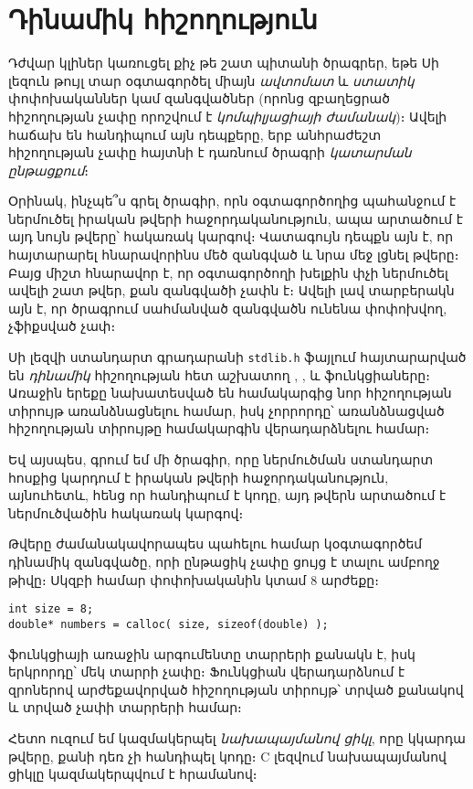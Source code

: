 \chapter{Դինամիկ հիշողություն}

Դժվար կլիներ կառուցել քիչ թե շատ պիտանի ծրագրեր, եթե Սի լեզուն թույլ տար
օգտագործել միայն \emph{ավտոմատ} և \emph{ստատիկ} փոփոխականներ կամ
զանգվածներ (որոնց զբաղեցրած հիշողության չափը որոշվում է
\emph{կոմպիլյացիայի ժամանակ})։ Ավելի հաճախ են հանդիպում այն դեպքերը, երբ
անհրաժեշտ հիշողության չափը հայտնի է դառնում ծրագրի \emph{կատարման
ընթացքում}։

Օրինակ, ինչպե՞ս գրել ծրագիր, որն օգտագործողից պահանջում է ներմուծել
իրական թվերի հաջորդականություն, ապա արտածում է այդ նույն թվերը՝ հակառակ
կարգով։ Վատագույն դեպքն այն է, որ հայտարարել հնարավորինս մեծ զանգված և
նրա մեջ լցնել թվերը։ Բայց միշտ հնարավոր է, որ օգտագործողի խելքին փչի
ներմուծել ավելի շատ թվեր, քան զանգվածի չափն է։ Ավելի լավ տարբերակն այն
է, որ ծրագրում սահմանված զանգվածն ունենա փոփոխվող, չֆիքսված չափ։

Սի լեզվի ստանդարտ գրադարանի \texttt{stdlib.h} ֆայլում հայտարարված են
\emph{դինամիկ} հիշողության հետ աշխատող ,
,  և  ֆունկցիաները։ Առաջին
երեքը նախատեսված են համակարգից նոր հիշողության տիրույթ առանձնացնելու
համար, իսկ չորրորդը՝ առանձնացված հիշողության տիրույթը համակարգին
վերադարձնելու համար։

Եվ այսպես, գրում եմ մի ծրագիր, որը ներմուծման ստանդարտ հոսքից կարդում է
իրական թվերի հաջորդականություն, այնուհետև, հենց որ հանդիպում է
 կոդը, այդ թվերն արտածում է ներմուծվածին հակառակ կարգով։

Թվերը ժամանակավորապես պահելու համար կօգտագործեմ  դինամիկ
զանգվածը, որի ընթացիկ չափը ցույց է տալու  ամբողջ թիվը։
Սկզբի համար  փոփոխականին կտամ 8 արժեքը։

\begin{Verbatim}
int size = 8;
double* numbers = calloc( size, sizeof(double) );
\end{Verbatim}

 ֆունկցիայի առաջին արգումենտը տարրերի քանակն է, իսկ
երկրորդը՝ մեկ տարրի չափը։ Ֆունկցիան վերադարձնում է զրոներով արժեքավորված
հիշողության տիրույթ՝ տրված քանակով և տրված չափի տարրերի համար։

Հետո ուզում եմ կազմակերպել \emph{նախապայմանով ցիկլ}, որը կկարդա թվերը,
քանի դեռ չի հանդիպել  կոդը։ C լեզվում նախապայմանով ցիկլը
կազմակերպվում է  հրամանով։

